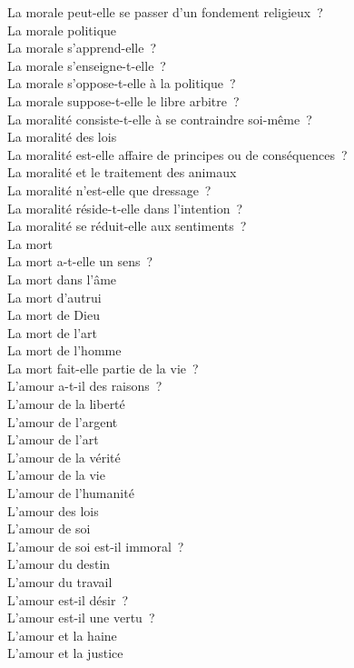\documentclass[a4paper,12pt]{article}
\begin{document}
La morale peut-elle se passer d'un fondement religieux ? \\
La morale politique \\
La morale s'apprend-elle ? \\
La morale s'enseigne-t-elle ? \\
La morale s'oppose-t-elle à la politique ? \\
La morale suppose-t-elle le libre arbitre ? \\
La moralité consiste-t-elle à se contraindre soi-même ? \\
La moralité des lois \\
La moralité est-elle affaire de principes ou de conséquences ? \\
La moralité et le traitement des animaux \\
La moralité n'est-elle que dressage ? \\
La moralité réside-t-elle dans l'intention ? \\
La moralité se réduit-elle aux sentiments ? \\
La mort \\
La mort a-t-elle un sens ? \\
La mort dans l'âme \\
La mort d'autrui \\
La mort de Dieu \\
La mort de l'art \\
La mort de l'homme \\
La mort fait-elle partie de la vie ? \\
L'amour a-t-il des raisons ? \\
L'amour de la liberté \\
L'amour de l'argent \\
L'amour de l'art \\
L'amour de la vérité \\
L'amour de la vie \\
L'amour de l'humanité \\
L'amour des lois \\
L'amour de soi \\
L'amour de soi est-il immoral ? \\
L'amour du destin \\
L'amour du travail \\
L'amour est-il désir ? \\
L'amour est-il une vertu ? \\
L'amour et la haine \\
L'amour et la justice \\
\end{document}
